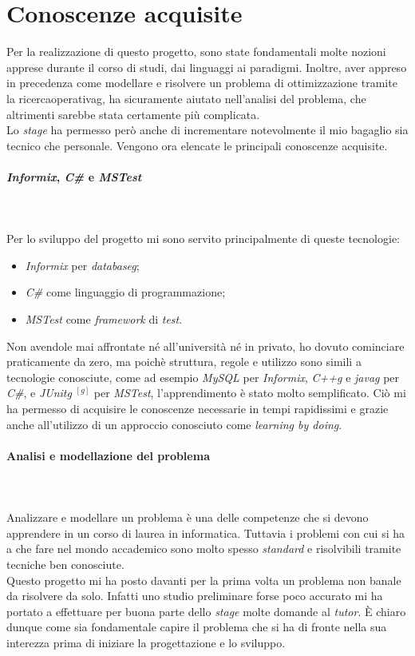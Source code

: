 \section{Conoscenze acquisite}
\label{sec:conoscenze-acquisite}
\noindent Per la realizzazione di questo progetto, sono state fondamentali
molte nozioni apprese durante il corso di studi, dai linguaggi ai paradigmi.
Inoltre, aver appreso in precedenza come modellare e risolvere un problema di ottimizzazione tramite la \gls{ricercaoperativag},
ha sicuramente aiutato nell'analisi del problema, che altrimenti sarebbe stata certamente più complicata.\\
Lo \textit{stage} ha permesso però anche di incrementare notevolmente il mio bagaglio
sia tecnico che personale.
Vengono ora elencate le principali conoscenze acquisite.
\paragraph{\textit{Informix}, \textit{C\#} e \textit{MSTest}}\hfill\\\\
\noindent Per lo sviluppo del progetto mi sono servito principalmente di queste tecnologie:
\begin{itemize}
    \item \textit{Informix} per \textit{\gls{databaseg}};
    \item \textit{C\#} come linguaggio di programmazione;
    \item \textit{MSTest} come \textit{framework} di \textit{test}.
\end{itemize}
\noindent Non avendole mai affrontate né all’università né in privato, ho dovuto
cominciare praticamente da zero, ma poichè struttura, regole e utilizzo sono simili
a tecnologie conosciute, come ad esempio \textit{MySQL} per \textit{Informix}, \textit{\gls{C++g}} e \textit{\gls{javag}} per \textit{C\#},
e \textit{\gls{JUnitg}} $^{[g]}$ per \textit{MSTest}, l’apprendimento è stato molto semplificato.
Ciò mi ha permesso di acquisire le conoscenze necessarie in tempi rapidissimi
e grazie anche all'utilizzo di un approccio conosciuto come \textit{learning
by doing}.
\paragraph{Analisi e modellazione del problema}\hfill\\\\
Analizzare e modellare un problema è una delle competenze che si devono apprendere
in un corso di laurea in informatica. Tuttavia i problemi con cui si ha a che fare
nel mondo accademico sono molto spesso \textit{standard} e risolvibili tramite tecniche
ben conosciute.\\
Questo progetto mi ha posto davanti per la prima volta un problema
non banale da risolvere da solo. Infatti uno studio preliminare forse poco accurato
mi ha portato a effettuare per buona parte dello \textit{stage} molte domande al \textit{tutor}.
È chiaro dunque come sia fondamentale capire il problema che si ha di fronte nella
sua interezza prima di iniziare la progettazione e lo sviluppo.

